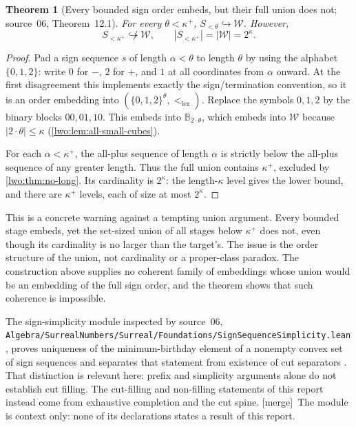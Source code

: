 \documentclass[11pt,a4paper]{article}
\newtheorem{theorem}{Theorem}[section]
\theoremstyle{definition}
\theoremstyle{remark}
\newcommand{\W}{\mathcal W}
\newcommand{\B}{\mathbb B}
\newcommand{\lex}{\mathrm{lex}}
\newcommand{\emb}{\hookrightarrow}
\newcommand{\merge}{\textsf{[merge]}}
\begin{document}
\begin{theorem}[Every bounded sign order embeds, but their full union does not; source~06, Theorem~12.1]
\label{lwo:sp:thm:surreals}
For every $\theta<\kappa^+$, $S_{<\theta}\emb\W$. However,
\[
 S_{<\kappa^+}\not\emb\W,
 \qquad |S_{<\kappa^+}|=|\W|=2^\kappa.
\]
\end{theorem}
\begin{proof}
Pad a sign sequence $s$ of length $\alpha<\theta$ to length $\theta$ by using
the alphabet $\{0,1,2\}$: write $0$ for $-$, $2$ for $+$, and $1$ at all
coordinates from $\alpha$ onward. At the first disagreement this implements
exactly the sign/termination convention, so it is an order embedding into
$(\{0,1,2\}^\theta,<_{\lex})$. Replace the symbols $0,1,2$ by the binary
blocks $00,01,10$. This embeds into $\B_{2\cdot\theta}$, which embeds into
$\W$ because $|2\cdot\theta|\leq\kappa$ (\cref{lwo:lem:all-small-cubes}).

For each $\alpha<\kappa^+$, the all-plus sequence of length $\alpha$ is
strictly below the all-plus sequence of any greater length. Thus the full
union contains $\kappa^+$, excluded by \cref{lwo:thm:no-long}. Its cardinality
is $2^\kappa$: the length-$\kappa$ level gives the lower bound, and there are
$\kappa^+$ levels, each of size at most $2^\kappa$.
\end{proof}
This is a concrete warning against a tempting union argument. Every bounded
stage embeds, yet the set-sized union of all stages below $\kappa^+$ does not,
even though its cardinality is no larger than the target's. The issue is the
order structure of the union, not cardinality or a proper-class paradox. The
construction above supplies no coherent family of embeddings whose union would
be an embedding of the full sign order, and the theorem shows that such
coherence is impossible.

The sign-simplicity module inspected by source~06,
\nolinkurl{Algebra/SurrealNumbers/Surreal/Foundations/SignSequenceSimplicity.lean},
proves uniqueness of the minimum-birthday element of a nonempty convex set of
sign sequences and separates that statement from existence of cut separators
\cite{signsimplicity}. That distinction is relevant here: prefix and simplicity
arguments alone do not establish cut filling. The cut-filling and non-filling
statements of this report instead come from exhaustive completion and the cut
spine. \merge\ The module is context only: none of its declarations states a
result of this report.

\end{document}
